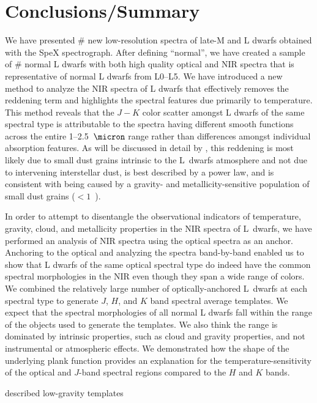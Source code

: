 \documentclass[12pt,preprint]{aastex}
\begin{document}
\section{Conclusions/Summary}
\label{sec:summary}

We have presented \# new low-resolution spectra of late-M and L dwarfs obtained with the SpeX spectrograph.
After defining ``normal'', we have created a sample of \# normal L dwarfs with both high quality optical and NIR spectra that is representative of normal L dwarfs from L0--L5.
We have introduced a new method to analyze the NIR spectra of L dwarfs that effectively removes the reddening term and highlights the spectral features due primarily to temperature. 
This method reveals that the $J-K$ color scatter amongst L dwarfs of the same spectral type is attributable to the spectra having different smooth functions across the entire 1--2.5~$\micron$ range rather than differences amongst individual absorption features.
As will be discussed in detail by \citet[in prep.]{Hiranaka13}, this reddening is most likely due to small dust grains intrinsic to the L~dwarfs atmosphere and not due to intervening interstellar dust, is best described by a power law, and is consistent with being caused by a gravity- and metallicity-sensitive population of small dust grains ($<1$~\micron).

In order to attempt to disentangle the observational indicators of temperature, gravity, cloud, and metallicity properties in the NIR spectra of L~dwarfs, we have performed an analysis of NIR spectra using the optical spectra as an anchor.
Anchoring to the optical and analyzing the spectra band-by-band enabled us to show that L dwarfs of the same optical spectral type do indeed have the common spectral morphologies in the NIR even though they span a wide range of colors.
We combined the relatively large number of optically-anchored L~dwarfs at each spectral type to generate $J$, $H$, and $K$ band spectral average templates. We expect that the spectral morphologies of all normal L dwarfs fall within the range of the objects used to generate the templates. We also think the range is dominated by intrinsic properties, such as cloud and gravity properties, and not instrumental or atmospheric effects.
We demonstrated how the shape of the underlying plank function provides an explanation for the temperature-sensitivity of the optical and $J$-band spectral regions compared to the $H$ and $K$ bands.

described low-gravity templates
\end{document}
